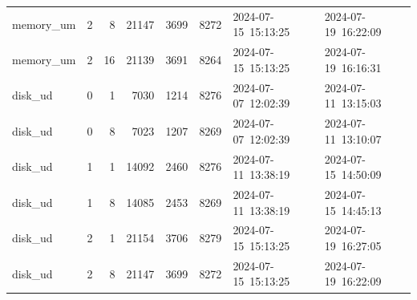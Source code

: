 \begin{table}[ht]
{\begin{tabular}{@{}llrrrrll@{}}
memory\_um & 2 & 8 & 21147 & 3699 & 8272 & 2024-07-15~15:13:25 & 2024-07-19~16:22:09 \\
memory\_um & 2 & 16 & 21139 & 3691 & 8264 & 2024-07-15~15:13:25 & 2024-07-19~16:16:31 \\
disk\_ud & 0 & 1 & 7030 & 1214 & 8276 & 2024-07-07~12:02:39 & 2024-07-11~13:15:03 \\
disk\_ud & 0 & 8 & 7023 & 1207 & 8269 & 2024-07-07~12:02:39 & 2024-07-11~13:10:07 \\
disk\_ud & 1 & 1 & 14092 & 2460 & 8276 & 2024-07-11~13:38:19 & 2024-07-15~14:50:09 \\
disk\_ud & 1 & 8 & 14085 & 2453 & 8269 & 2024-07-11~13:38:19 & 2024-07-15~14:45:13 \\
disk\_ud & 2 & 1 & 21154 & 3706 & 8279 & 2024-07-15~15:13:25 & 2024-07-19~16:27:05 \\
disk\_ud & 2 & 8 & 21147 & 3699 & 8272 & 2024-07-15~15:13:25 & 2024-07-19~16:22:09 \\
\bottomrule
\end{tabular}%
}
\end{table}
